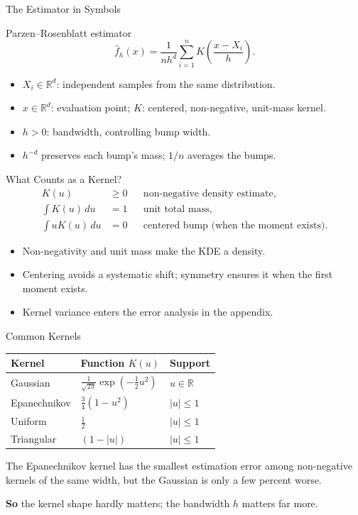 \documentclass[10pt,aspectratio=169]{ntuabeamer}
\newcommand{\takeaway}[1]{\par\vspace{0.7em}\textcolor{ntuablue}{\textbf{So} #1}\par}
\begin{document}
	\begin{frame}{The Estimator in Symbols}
\small
\begin{block}{Parzen--Rosenblatt estimator}
\[
 \widehat f_h(x)=\frac1{nh^d}\sum_{i=1}^n K\!\left(\frac{x-X_i}{h}\right).
\]
\end{block}
\begin{itemize}
\item $X_i\in\mathbb R^d$: independent samples from the same distribution.
\item $x\in\mathbb R^d$: evaluation point; $K$: centered, non-negative, unit-mass kernel.
\item $h>0$: bandwidth, controlling bump width.
\item $h^{-d}$ preserves each bump's mass; $1/n$ averages the bumps.
\end{itemize}
\end{frame}

	\begin{frame}{What Counts as a Kernel?}
\small
\begin{align*}
 K(u)&\ge0 &&\text{non-negative density estimate},\\
 \int K(u)\,du&=1 &&\text{unit total mass},\\
 \int uK(u)\,du&=0 &&\text{centered bump (when the moment exists)}.
\end{align*}
\begin{itemize}
\item Non-negativity and unit mass make the KDE a density.
\item Centering avoids a systematic shift; symmetry ensures it when the first moment exists.
\item Kernel variance enters the error analysis in the appendix.
\end{itemize}
\end{frame}

	\begin{frame}{Common Kernels}
		\small
		\begin{table}[]
			\centering
			\renewcommand{\arraystretch}{1.9}
			\begin{tabular}{l l l}
				\toprule
				\textbf{Kernel} & \textbf{Function} $K(u)$ & \textbf{Support} \\
				\midrule
				Gaussian & $\displaystyle \frac{1}{\sqrt{2\pi}} \exp\left(-\frac{1}{2}u^2\right)$ & $u \in \mathbb{R}$ \\
				Epanechnikov & $\displaystyle \frac{3}{4}(1 - u^2)$ & $|u| \le 1$ \\
				Uniform & $\displaystyle \frac{1}{2}$ & $|u| \le 1$ \\
				Triangular & $\displaystyle (1 - |u|)$ & $|u| \le 1$ \\
				\bottomrule
			\end{tabular}
		\end{table}

		The Epanechnikov kernel has the smallest estimation error among non-negative kernels of the same width,
		but the Gaussian is only a few percent worse.

		\takeaway{the kernel shape hardly matters; the bandwidth $h$ matters far more.}
	\end{frame}
\end{document}
